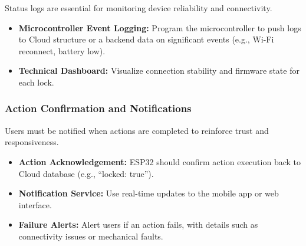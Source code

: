 Status logs are essential for monitoring device reliability and connectivity.

\begin{itemize}
  \item \textbf{Microcontroller Event Logging:} Program the microcontroller to push logs to Cloud structure or a backend data on significant events (e.g., Wi-Fi reconnect, battery low).
  \item \textbf{Technical Dashboard:} Visualize connection stability and firmware state for each lock.
\end{itemize}

\subsubsection{Action Confirmation and Notifications}

Users must be notified when actions are completed to reinforce trust and responsiveness.

\begin{itemize}
  \item \textbf{Action Acknowledgement:} ESP32 should confirm action execution back to Cloud database (e.g., “locked: true”).
  \item \textbf{Notification Service:} Use real-time updates to the mobile app or web interface.
  \item \textbf{Failure Alerts:} Alert users if an action fails, with details such as connectivity issues or mechanical faults.
\end{itemize}
